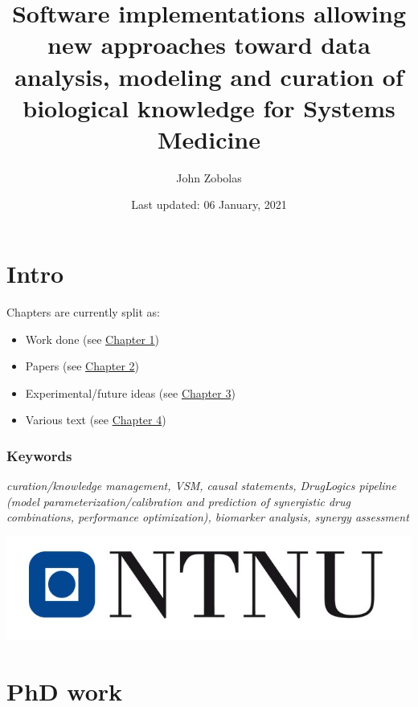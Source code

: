 \documentclass[
  12pt,
]{book}
\title{Software implementations allowing new approaches toward data analysis, modeling and curation of biological knowledge for Systems Medicine}
\author{John Zobolas}
\date{Last updated: 06 January, 2021}
\providecommand{\tightlist}{%
  \setlength{\itemsep}{0pt}\setlength{\parskip}{0pt}}
\begin{document}
\maketitle

{
\hypersetup{linkcolor=}
\setcounter{tocdepth}{1}
\tableofcontents
}
\listoftables
\listoffigures
{}
\hypertarget{intro}{%
\chapter*{Intro}\label{intro}}

Chapters are currently split as:

\begin{itemize}
\tightlist
\item
  Work done (see \protect\hyperlink{phd-work}{Chapter 1})
\item
  Papers (see \protect\hyperlink{phd-papers}{Chapter 2})
\item
  Experimental/future ideas (see \protect\hyperlink{phd-ideas}{Chapter 3})
\item
  Various text (see \protect\hyperlink{text}{Chapter 4})
\end{itemize}

\hypertarget{keywords}{%
\subsection*{Keywords}\label{keywords}}

\begin{blue-box}

\emph{curation/knowledge management, VSM, causal statements, DrugLogics pipeline
(model parameterization/calibration and prediction of synergistic drug combinations, performance optimization), biomarker analysis, synergy assessment}

\end{blue-box}

\begin{center}\includegraphics[width=0.5\linewidth]{img/NTNU-logo} \end{center}

\hypertarget{phd-work}{%
\chapter{PhD work}\label{phd-work}}
\end{document}

